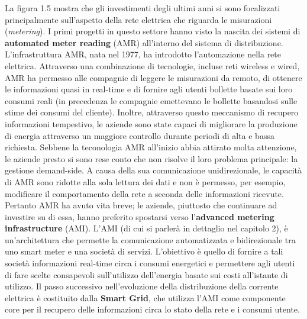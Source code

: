 La figura 1.5 mostra che gli investimenti degli ultimi anni si sono focalizzati principalmente sull'aspetto della rete elettrica che riguarda le misurazioni (\textit{metering}). \newline I primi progetti in questo settore hanno visto la nascita dei sistemi di \textbf{automated meter reading} (AMR) all'interno del sistema di distribuzione. \newline
L'infrastruttura AMR, nata nel 1977, ha introdotto l'automazione nella rete elettrica. Attraverso una combinazione di tecnologie, incluse reti wireless e wired,   AMR ha permesso alle compagnie di leggere le misurazioni da remoto, di ottenere le informazioni quasi in real-time e di fornire agli utenti bollette basate sui loro consumi reali (in precedenza le compagnie emettevano le bollette basandosi sulle stime dei consumi del cliente).  \newline Inoltre, attraverso questo meccanismo di recupero informazioni tempestivo, le aziende sono state capaci di migliorare la produzione di energia attraverso un maggiore controllo durante periodi di alta e bassa richiesta. \newline \newline
Sebbene la teconologia AMR all'inizio abbia attirato molta attenzione, le aziende presto si sono rese conto che non risolve il loro problema principale: la gestione demand-side. A causa della sua comunicazione unidirezionale, le capacità di AMR sono ridotte alla sola lettura dei dati e non è permesso, per esempio, modificare il comportamento della rete a seconda delle informazioni ricevute. \newline Pertanto AMR ha avuto vita breve; le aziende, piuttosto che continuare ad investire su di essa, hanno preferito spostarsi verso l'\textbf{advanced metering infrastructure} (AMI). \newline
L'AMI (di cui si parlerà in dettaglio nel capitolo 2), è un'architettura che permette la comunicazione automatizzata e bidirezionale tra uno smart meter e una società di servizi. L'obiettivo è quello di fornire a tali società informazioni real-time circa i consumi energetici e permettere agli utenti di fare scelte consapevoli sull'utilizzo dell'energia basate sui costi all'istante di utilizzo.
\newline
\newline
Il passo successivo nell'evoluzione della distribuzione della corrente elettrica è costituito dalla \textbf{Smart Grid}, che utilizza l'AMI come componente core per il recupero delle informazioni circa lo stato della rete e i consumi utente.
\newpage

